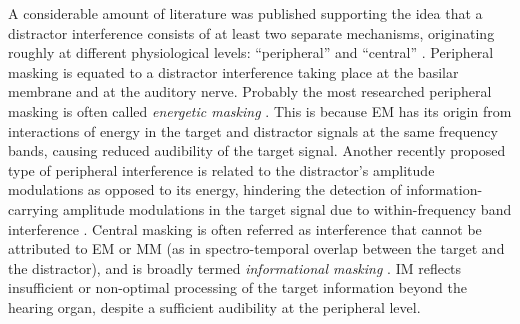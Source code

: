 \documentclass[a4paper, twoside]{templates/ociamthesis}
\begin{document}
A considerable amount of literature was published supporting the idea that a distractor interference consists of at least two separate mechanisms, originating roughly at different physiological levels: ``peripheral'' and ``central'' \autocite[for an overview see][]{Moore2012}.
Peripheral masking is equated to a distractor interference taking place at the basilar membrane and at the auditory nerve. Probably the most researched peripheral masking is often called \textit{energetic masking} \autocites[EM; see][]{Moore2012,Rosen2013}. This is because EM has its origin from interactions of energy in the target and distractor signals at the same frequency bands, causing reduced audibility of the target signal.
Another recently proposed type of peripheral interference is related to the distractor's amplitude modulations as opposed to its energy, hindering the detection of information-carrying amplitude modulations in the target signal due to within-frequency band interference \autocite[i.e., \textit{modulation masking}, MM;][]{Stone2012}.
Central masking is often referred as interference that cannot be attributed to EM or MM (as in spectro-temporal overlap between the target and the distractor), and is broadly termed \textit{informational masking} \autocites[IM;][]{Kidd2002,Durlach2003,Moore2012}. IM reflects insufficient or non-optimal processing of the target information beyond the hearing organ, despite a sufficient audibility at the peripheral level.\\
\end{document}
